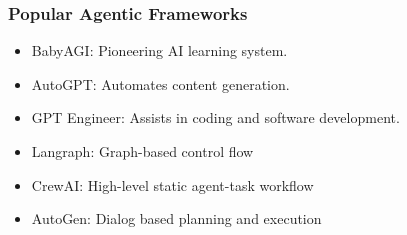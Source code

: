 \begin{frame}[fragile]\frametitle{Popular Agentic Frameworks}

  \begin{itemize}
    \item BabyAGI: Pioneering AI learning system.
    \item AutoGPT: Automates content generation.
    \item GPT Engineer: Assists in coding and software development.
	\item Langraph: Graph-based control flow
	\item CrewAI: High-level static agent-task workflow
    \item AutoGen: Dialog based planning and execution
  \end{itemize}
\end{frame}

